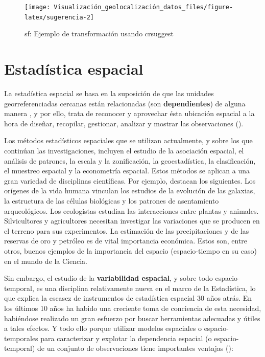 \documentclass[
]{book}
\theoremstyle{definition}
\theoremstyle{definition}
\theoremstyle{definition}
\theoremstyle{definition}
\theoremstyle{remark}
\begin{document}
\begin{figure}

{\centering \texttt{[image: Visualización\_geolocalización\_datos\_files/figure-latex/sugerencia-2]} 

}

\caption{sf: Ejemplo de transformación usando crsuggest}\label{fig:sugerencia-2}
\end{figure}

\hypertarget{dep-esp}{%
\chapter{Estadística espacial}\label{dep-esp}}

La estadística espacial se basa en la suposición de que las unidades
georreferenciadas cercanas están relacionadas (son \textbf{dependientes}) de alguna
manera \citep{getis_1999}, y por ello, trata de reconocer y aprovechar ésta ubicación
espacial a la hora de diseñar, recopilar, gestionar, analizar y mostrar las
observaciones (\citet{montero_et_al_2011}).

Los métodos estadísticos espaciales que se utilizan actualmente, y sobre los que
continúan las investigaciones, incluyen el estudio de la asociación espacial, el
análisis de patrones, la escala y la zonificación, la geoestadística, la
clasificación, el muestreo espacial y la econometría espacial. Estos métodos se
aplican a una gran variedad de disciplinas científicas. Por ejemplo,
\citet{montero_et_al_2011} destacan los siguientes. Los orígenes de la vida humana
vinculan los estudios de la evolución de las galaxias, la estructura de las
células biológicas y los patrones de asentamiento arqueológicos. Los ecologistas
estudian las interacciones entre plantas y animales. Silvicultores y
agricultores necesitan investigar las variaciones que se producen en el terreno
para sus experimentos. La estimación de las precipitaciones y de las reservas de
oro y petróleo es de vital importancia económica. Estos son, entre otros, buenos
ejemplos de la importancia del espacio (espacio-tiempo en su caso) en el mundo
de la Ciencia.

Sin embargo, el estudio de la \textbf{variabilidad espacial}, y sobre todo
espacio-temporal, es una disciplina relativamente nueva en el marco de la
Estadística, lo que explica la escasez de instrumentos de estadística espacial
30 años atrás. En los últimos 10 años ha habido una creciente toma de conciencia
de esta necesidad, habiéndose realizado un gran esfuerzo por buscar herramientas
adecuadas y útiles a tales efectos. Y todo ello porque utilizar modelos
espaciales o espacio-temporales para caracterizar y explotar la dependencia
espacial (o espacio-temporal) de un conjunto de observaciones tiene importantes
ventajas (\citet{montero_et_al_2011}):
\end{document}

